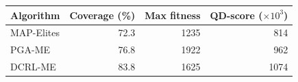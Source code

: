 \begin{tabular}{lrrr}
\toprule
Algorithm & Coverage (\%) & Max fitness & QD-score ($\times 10^3$) \\
\midrule
MAP-Elites & 72.3 & 1235 & 814 \\
PGA-ME & 76.8 & 1922 & 962 \\
DCRL-ME & 83.8 & 1625 & 1074 \\
\bottomrule
\end{tabular}
